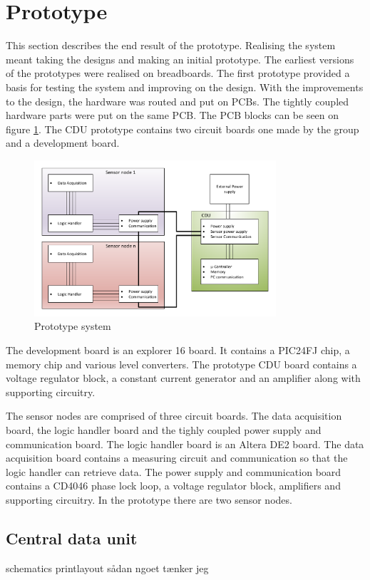 \section{Prototype}
This section describes the end result of the prototype.
Realising the system meant taking the designs and making an initial prototype. The earliest versions of the prototypes were realised on breadboards. The first prototype provided a basis for testing the system and improving on the design. With the improvements to the design, the hardware was routed and put on PCBs. The tightly coupled hardware parts were put on the same PCB. The PCB blocks can be seen on figure \ref{fig:prototype}. The CDU prototype contains two circuit boards one made by the group and a development board. 
\begin{figure}[H]
	\centering
	\includegraphics[width=0.8\textwidth]{billeder/11ProjectDescription/prototypesystem}
	\caption{Prototype system}
	\label{fig:prototype}
\end{figure}
The development board is an explorer 16 board. It contains a PIC24FJ chip, a memory chip and various level converters. The prototype CDU board contains a voltage regulator block, a constant current generator and an amplifier along with supporting circuitry.

The sensor nodes are comprised of three circuit boards. The data acquisition board, the logic handler board and the tighly coupled power supply and communication board. The logic handler board is an Altera DE2 board. The data acquisition board contains a measuring circuit and communication so that the logic handler can retrieve data. The power supply and communication board contains a CD4046 phase lock loop, a voltage regulator block, amplifiers and supporting circuitry. In the prototype there are two sensor nodes.

\subsection{Central data unit}
schematics printlayout sådan ngoet tænker jeg

